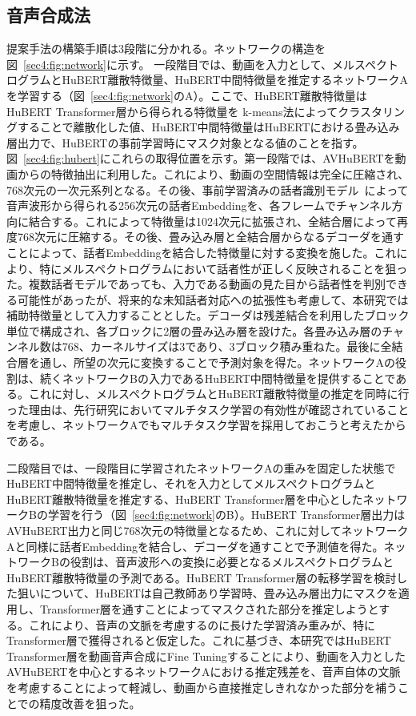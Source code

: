 \documentclass[12pt]{jarticle}
\numberwithin{equation}{section}    %
\numberwithin{figure}{section}      %
\numberwithin{table}{section}      %
\begin{document}
\subsection{音声合成法}
提案手法の構築手順は3段階に分かれる。ネットワークの構造を図~\ref{sec4:fig:network}に示す。
一段階目では、動画を入力として、メルスペクトログラムとHuBERT離散特徴量、HuBERT中間特徴量を推定するネットワークAを学習する（図~\ref{sec4:fig:network}のA）。ここで、HuBERT離散特徴量はHuBERT Transformer層から得られる特徴量を k-means法によってクラスタリングすることで離散化した値、HuBERT中間特徴量はHuBERTにおける畳み込み層出力で、HuBERTの事前学習時にマスク対象となる値のことを指す。図~\ref{sec4:fig:hubert}にこれらの取得位置を示す。第一段階では、AVHuBERTを動画からの特徴抽出に利用した。これにより、動画の空間情報は完全に圧縮され、768次元の一次元系列となる。その後、事前学習済みの話者識別モデル~\cite{wan2018generalized}によって音声波形から得られる256次元の話者Embeddingを、各フレームでチャンネル方向に結合する。これによって特徴量は1024次元に拡張され、全結合層によって再度768次元に圧縮する。その後、畳み込み層と全結合層からなるデコーダを通すことによって、話者Embeddingを結合した特徴量に対する変換を施した。これにより、特にメルスペクトログラムにおいて話者性が正しく反映されることを狙った。複数話者モデルであっても、入力である動画の見た目から話者性を判別できる可能性があったが、将来的な未知話者対応への拡張性も考慮して、本研究では補助特徴量として入力することとした。デコーダは残差結合を利用したブロック単位で構成され、各ブロックに2層の畳み込み層を設けた。各畳み込み層のチャンネル数は768、カーネルサイズは3であり、3ブロック積み重ねた。最後に全結合層を通し、所望の次元に変換することで予測対象を得た。ネットワークAの役割は、続くネットワークBの入力であるHuBERT中間特徴量を提供することである。これに対し、メルスペクトログラムとHuBERT離散特徴量の推定を同時に行った理由は、先行研究においてマルチタスク学習の有効性が確認されていることを考慮し、ネットワークAでもマルチタスク学習を採用しておこうと考えたからである。

二段階目では、一段階目に学習されたネットワークAの重みを固定した状態でHuBERT中間特徴量を推定し、それを入力としてメルスペクトログラムとHuBERT離散特徴量を推定する、HuBERT Transformer層を中心としたネットワークBの学習を行う（図~\ref{sec4:fig:network}のB）。HuBERT Transformer層出力はAVHuBERT出力と同じ768次元の特徴量となるため、これに対してネットワークAと同様に話者Embeddingを結合し、デコーダを通すことで予測値を得た。ネットワークBの役割は、音声波形への変換に必要となるメルスペクトログラムとHuBERT離散特徴量の予測である。HuBERT Transformer層の転移学習を検討した狙いについて、HuBERTは自己教師あり学習時、畳み込み層出力にマスクを適用し、Transformer層を通すことによってマスクされた部分を推定しようとする。これにより、音声の文脈を考慮するのに長けた学習済み重みが、特にTransformer層で獲得されると仮定した。これに基づき、本研究ではHuBERT Transformer層を動画音声合成にFine Tuningすることにより、動画を入力としたAVHuBERTを中心とするネットワークAにおける推定残差を、音声自体の文脈を考慮することによって軽減し、動画から直接推定しきれなかった部分を補うことでの精度改善を狙った。
\end{document}

